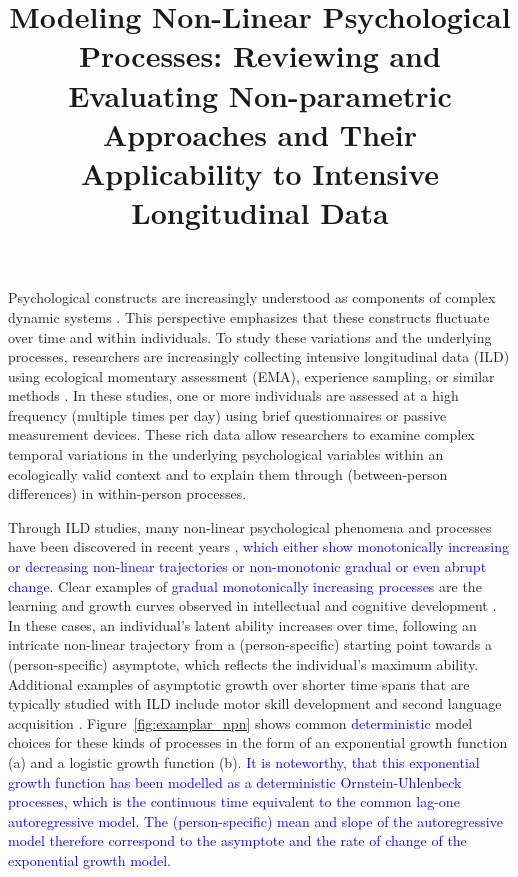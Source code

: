 \documentclass[man, floatsintext]{apa7}
\title{Modeling Non-Linear Psychological Processes: Reviewing and Evaluating
  Non-parametric Approaches and Their Applicability to Intensive
  Longitudinal Data}
\begin{document}
\maketitle

Psychological constructs are increasingly understood as components of complex
dynamic systems \parencite{nesselroade_studying_2004, wang_investigating_2012}.
This perspective emphasizes that these constructs fluctuate over time and
within individuals. To study these variations and the underlying processes,
researchers are increasingly collecting intensive longitudinal data (ILD) using
ecological momentary assessment (EMA), experience sampling, or similar methods
\parencite{fritz_so_2023}. In these studies, one or more individuals are
assessed at a high frequency (multiple times per day) using brief
questionnaires or passive measurement devices. These rich data allow
researchers to examine complex temporal variations in the underlying
psychological variables within an ecologically valid context and to explain
them through (between-person differences) in within-person processes.

Through ILD studies, many non-linear psychological phenomena and processes have
been discovered in recent years \textcolor{blue}{, which either show
  monotonically increasing or decreasing non-linear trajectories or
  non-monotonic
  gradual or even abrupt change}. Clear examples of \textcolor{blue}{ gradual
  monotonically increasing processes} are the learning and growth curves
observed
in intellectual and cognitive development \parencite{kunnen_dynamic_2012,
  mcardle_comparative_2002}. In these cases, an individual's latent ability
increases over time, following an intricate non-linear trajectory from a
(person-specific) starting point towards a (person-specific) asymptote, which
reflects the individual's maximum ability. Additional examples of asymptotic
growth over shorter time spans that are typically studied with ILD include
motor skill development \parencite{newell_time_2001} and second language
acquisition \parencite{de_bot_dynamic_2007}. Figure~\ref{fig:examplar_npn}
shows common \textcolor{blue}{deterministic} model choices for these kinds of
processes in the form of an exponential growth function (a) and a logistic
growth function (b). \textcolor{blue}{It is noteworthy, that this exponential
  growth function has been modelled as a deterministic Ornstein-Uhlenbeck
  processes, which is the continuous time equivalent to the common lag-one
  autoregressive model. The (person-specific) mean and slope of the
  autoregressive model therefore correspond to the asymptote and the rate of
  change of the exponential growth model.}
\end{document}
